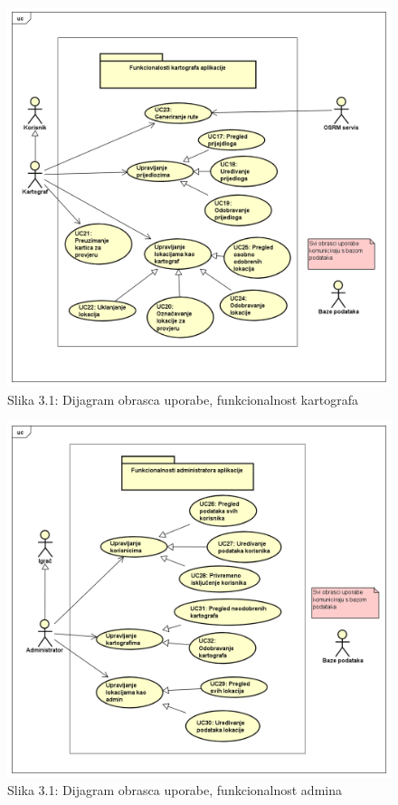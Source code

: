				\begin{figure}[H]
        			\includegraphics[scale=0.5]{slike/UCDiagrami/kartograf.png} %
        			\centering
        			\caption{Slika 3.1: Dijagram obrasca uporabe, funkcionalnost kartografa}
        			\label{fig:promjene}
        		\end{figure}
					
				\begin{figure}[H]
        			\includegraphics[scale=0.5]{slike/UCDiagrami/admin.png} %
        			\centering
        			\caption{Slika 3.1: Dijagram obrasca uporabe, funkcionalnost admina}
        			\label{fig:promjene}
        		\end{figure}
				
